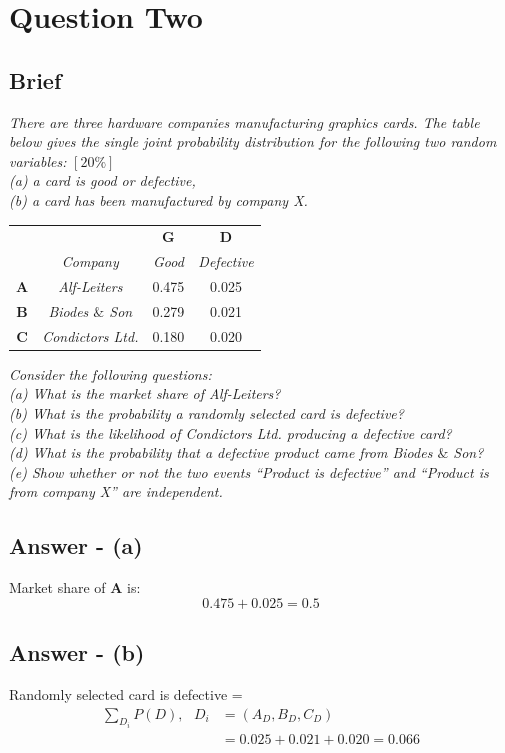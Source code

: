 \documentclass{article}
\begin{document}
\section{Question Two}
\subsection{Brief}
\textit{There are three hardware companies manufacturing graphics cards. The table below gives
the single joint probability distribution for the following two random variables:}
$[20\%]$ \\
\newline
\textit{(a) a card is good or defective, \\
(b) a card has been manufactured by company X.} 
\begin{center}
\begin{tabular}{cc || c | c}
\multicolumn{1}{c}{} & \multicolumn{1}{c}{} & \multicolumn{1}{c}{\textbf{G}} & \multicolumn{1}{c}{\textbf{D}} \\
$\ $ & \textit{Company} & \textit{Good} & \textit{Defective} \\ \hhline{~=#=|=}
\textbf{A} & \textit{Alf-Leiters} & 0.475 &  0.025 \\ \hhline{~-|-|-}
\textbf{B} & \textit{ Biodes $\&$ Son} & 0.279 & 0.021 \\ \hhline{~-|-|-}
\textbf{C} & \textit{Condictors Ltd.} & 0.180 & 0.020 \\
\end{tabular}
\end{center}
\textit{Consider the following questions: \\
\newline
(a) What is the market share of Alf-Leiters? \\ 
(b) What is the probability a randomly selected card is defective? \\
(c) What is the likelihood of Condictors Ltd. producing a defective card? \\
(d) What is the probability that a defective product came from Biodes $\&$ Son? \\
(e) Show whether or not the two events “Product is defective” and “Product is from
company X” are independent.
}
\subsection{Answer - (a)}
Market share of \textbf{A} is:
$$0.475 + 0.025 = 0.5$$

\subsection{Answer - (b)}
Randomly selected card is defective =
\begin{align*}
\sum\nolimits_{D_i} P(D), \ \ \ D_{i} &= (A_{D}, B_{D}, C_{D}) \\
&= 0.025 + 0.021 + 0.020 = 0.066
\end{align*}
\end{document}

